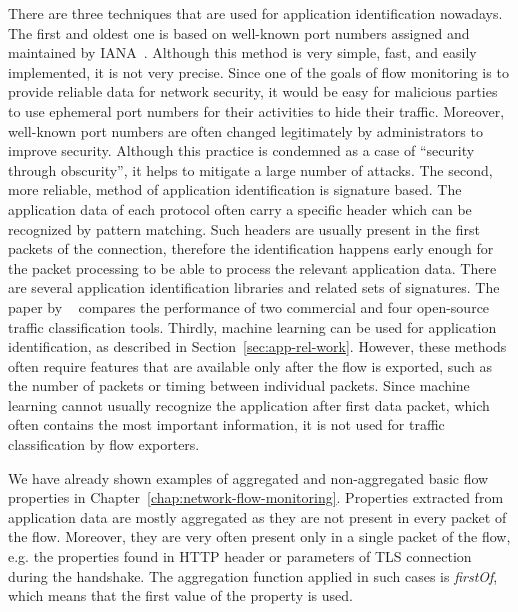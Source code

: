 There are three techniques that are used for application identification nowadays. The first and oldest one is based on well-known port numbers assigned and maintained by IANA~\cite{IANA-2017-Service}. Although this method is very simple, fast, and easily implemented, it is not very precise. Since one of the goals of flow monitoring is to provide reliable data for network security, it would be easy for malicious parties to use ephemeral port numbers for their activities to hide their traffic. Moreover, well-known port numbers are often changed legitimately by administrators to improve security. Although this practice is condemned as a case of ``security through obscurity'', it helps to mitigate a large number of attacks. The second, more reliable, method of application identification is signature based. The application data of each protocol often carry a specific header which can be recognized by pattern matching. Such headers are usually present in the first packets of the connection, therefore the identification happens early enough for the packet processing to be able to process the relevant application data. There are several application identification libraries and related sets of signatures. The paper by \citeauthor{Bujlow-2015-classification}~\cite{Bujlow-2015-classification} compares the performance of two commercial and four open-source traffic classification tools. Thirdly, machine learning can be used for application identification, as described in Section~\ref{sec:app-rel-work}. However, these methods often require features that are available only after the flow is exported, such as the number of packets or timing between individual packets. Since machine learning cannot usually recognize the application after first data packet, which often contains the most important information, it is not used for traffic classification by flow exporters.

We have already shown examples of aggregated and non-aggregated basic flow properties in Chapter~\ref{chap:network-flow-monitoring}. Properties extracted from application data are mostly aggregated as they are not present in every packet of the flow. Moreover, they are very often present only in a single packet of the flow, e.g. the properties found in HTTP header or parameters of TLS connection during the handshake. The aggregation function applied in such cases is \emph{firstOf}, which means that the first value of the property is used. 

